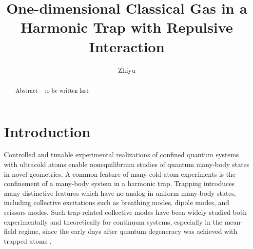 \documentclass[aps,preprintnumbers,onecolumn,amsmath,amssymb,floatfix,pra]{revtex4-1}
\begin{document}
 \title{One-dimensional Classical Gas in a Harmonic Trap with Repulsive Interaction}
 \author{Zhiyu}
 
 
\begin{abstract}

Abstract --  to be written last
   
\end{abstract}

\maketitle


\section{Introduction}
 
Controlled and tunable experimental realizations of confined quantum systems with ultracold atoms
enable nonequilibrium studies of quantum many-body states in novel geometries. A common feature of
many cold-atom experiments is the confinement of a many-body system in a harmonic trap. Trapping
introduces many distinctive features which have no analog in uniform many-body states, including
collective excitations such as breathing modes, dipole modes, and scissors modes. Such trap-related
collective modes have been widely studied both experimentally and theoretically for continuum
systems, especially in the mean-field regime, since the early days after quantum degeneracy was
achieved with trapped atoms \cite{Dalfovo1997}\cite{Jin1996}.
\end{document}

